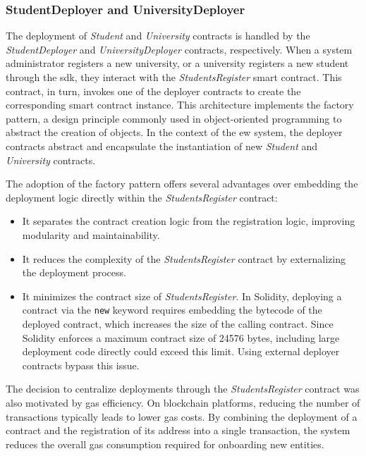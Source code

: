 \subsubsection{StudentDeployer and UniversityDeployer}
The deployment of \textit{Student} and \textit{University} contracts is handled by the \textit{StudentDeployer} and \textit{UniversityDeployer} contracts, respectively. When a system administrator registers a new university, or a university registers a new student through the \acrshort{sdk}, they interact with the \textit{StudentsRegister} smart contract. This contract, in turn, invokes one of the deployer contracts to create the corresponding smart contract instance. This architecture implements the factory pattern, a design principle commonly used in object-oriented programming to abstract the creation of objects. In the context of the \acrshort{ew} system, the deployer contracts abstract and encapsulate the instantiation of new \textit{Student} and \textit{University} contracts.

The adoption of the factory pattern offers several advantages over embedding the deployment logic directly within the \textit{StudentsRegister} contract:

\begin{itemize}
    \item It separates the contract creation logic from the registration logic, improving modularity and maintainability.
    \item It reduces the complexity of the \textit{StudentsRegister} contract by externalizing the deployment process.
    \item It minimizes the contract size of \textit{StudentsRegister}. In Solidity, deploying a contract via the \texttt{new} keyword requires embedding the bytecode of the deployed contract, which increases the size of the calling contract. Since Solidity enforces a maximum contract size of 24576 bytes, including large deployment code directly could exceed this limit. Using external deployer contracts bypass this issue.
\end{itemize}

The decision to centralize deployments through the \textit{StudentsRegister} contract was also motivated by gas efficiency. On blockchain platforms, reducing the number of transactions typically leads to lower gas costs. By combining the deployment of a contract and the registration of its address into a single transaction, the system reduces the overall gas consumption required for onboarding new entities.

